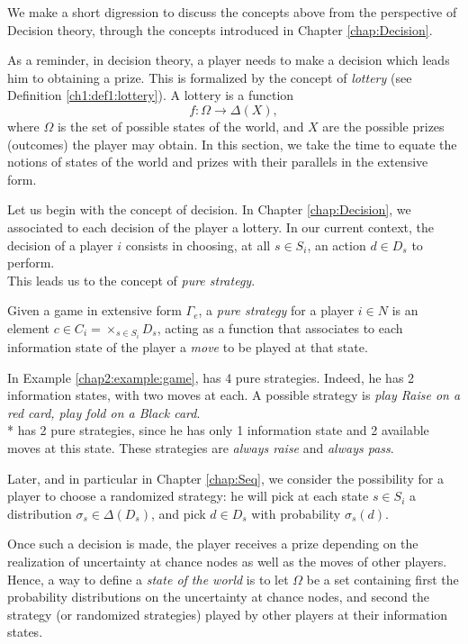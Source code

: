 We make a short digression to discuss the concepts above from the perspective of Decision theory, through the concepts introduced in Chapter \ref{chap:Decision}.

As a reminder, in decision theory, a player needs to make a decision which leads him to obtaining a prize. This is formalized by the concept of \emph{lottery} (see Definition \ref{ch1:def1:lottery}).
A lottery is a function
$$f : \Omega \rightarrow \Delta(X), $$
where $\Omega$ is the set of possible states of the world, and $X$ are the possible prizes (outcomes) the player may obtain. In this section, we take the time to equate the notions of states of the world and prizes with their parallels in the extensive form.

Let us begin with the concept of decision. In Chapter \ref{chap:Decision}, we associated to each decision of the player a lottery.
 In our current context, the decision of a player $i$ consists in choosing, at all $s \in S_i$, an action $d \in D_s$ to perform.\\
 This leads us to the concept of \emph{pure strategy}. \\
 \begin{definition} 
Given a game in extensive form $\Gamma_e$, a \emph{pure strategy} for a player $i \in N$ is an element
$c \in C_i = \times_{s \in S_i} D_s$, acting as a function that associates to each information  state of the player a \emph{move} to be played at that state.
\end{definition}
\begin{example}
In Example \ref{chap2:example:game},
\TAtwo{} has 4 pure strategies. Indeed, he has 2 information states,
with two moves at each. A possible strategy is
\emph{play Raise on a red card, play fold on a Black card}.\\*
\TAone{} has 2 pure strategies, since he has only 1 information state and 2 available moves at this state.
These strategies are \emph{always raise} and \emph{always pass}.
\end{example}
 Later, and in particular in Chapter \ref{chap:Seq}, we consider the possibility for a player to choose a randomized strategy: he will pick at each state $s \in S_i$ a distribution $\sigma_s \in \Delta(D_s)$, and pick $d \in D_s$ with probability $\sigma_s(d)$.

Once such a decision is made, the player receives a prize depending on the realization of uncertainty at chance nodes as well as the moves of other players. Hence, a way to define a \emph{state of the world} is to
let $\Omega$ be a set containing first the probability distributions on the uncertainty at chance nodes, and second the strategy (or randomized strategies) played by other players at their information states.

